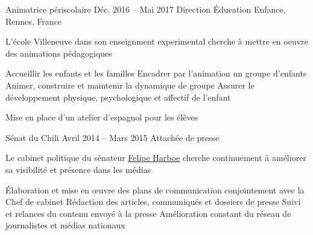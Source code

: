 %
%



\begin{joblist}



\item[Animatrice périscolaire]{Déc. 2016 -- Mai 2017 }     
  	{Direction Éducation Enfance, Rennes, France}     
	{
		 L'école Villeneuve dans son enseignment experimental cherche à mettre en oeuvre des animations pédagogiques \\
		  
		\iftbftiny \setlength{\parskip}{-10pt} \fi
		\begin{itemize}
			  \iftbftiny \setlength\itemsep{-3pt} \fi
			  \cvitem[\checkmark] Accueillir les enfants et les familles
			  \cvitem[\checkmark] Encadrer par l’animation un groupe d’enfants
			  \cvitem[\checkmark] Animer, construire et maintenir la dynamique de groupe
			  \cvitem[\checkmark] Assurer le développement physique, psychologique et affectif de l’enfant
		\end{itemize}

		 Mise en place d'un atelier d'espagnol pour les élèves
	}



\item[Sénat du Chili]{Avril 2014 -- Mars 2015}
     {Attachée de presse}
	 {
			 Le cabinet politique du sénateur \href{http://harboesenador.cl/}{Felipe Harboe} cherche continuement à améliorer sa visibilité et présence dans les médias \\ 
			\mission{Missions :} 
                
			\iftbftiny \setlength{\parskip}{-10pt} \fi
			\begin{itemize}
			  \iftbftiny \setlength\itemsep{-3pt} \fi
			  \cvitem[\checkmark] Élaboration et mise en œuvre des plans de communication conjointement avec la Chef de cabinet
			  \cvitem[\checkmark] Rédaction des articles, communiqués et dossiers de presse
			  \cvitem[\checkmark] Suivi et relances du contenu envoyé à la presse
			  \cvitem[\checkmark] Amélioration constant du réseau de journalistes et médias nationaux
			\end{itemize}     
			
}
\end{joblist}
